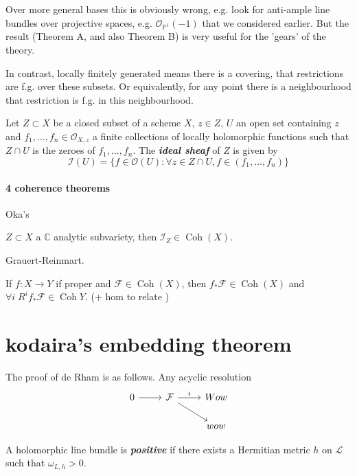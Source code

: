 \documentclass{article}
\newcommand{\C}{\mathbb{C}}
\renewcommand{\P}{\mathbb{P}}
\newcommand{\Fc}{\mathcal{F}}
\newcommand{\Ic}{\mathcal{I}}
\newcommand{\Lc}{\mathcal{L}}
\newcommand{\Oc}{\mathcal{O}}
\DeclareMathOperator{\Coh}{Coh}
\begin{document}
Over more general bases this is obviously wrong, e.g. look for anti-ample line bundles over projective spaces, e.g. $\Oc_{\P^1}(-1)$ that we considered earlier. But the result (Theorem A, and also Theorem B) is very useful for the 'gears' of the theory.

In contrast, locally finitely generated means there is a covering, that restrictions are f.g. over these subsets. Or equivalently, for any point there is a neighbourhood that restriction is f.g. in this neighbourhood.

\begin{defn}
	Let $Z\subset X$ be a closed subset of a scheme $X$, $z\in Z$, $U$ an open set containing $z$ and $f_1,\ldots,f_n\in\Oc_{X,z}$ a finite collections of locally holomorphic functions such that $Z\cap U$ is the zeroes of $f_1,\ldots,f_n$. The \textbf{\textit{ideal sheaf}} of $Z$ is given by
	\[\Ic(U)=\{f\in\Oc(U):\forall z\in Z\cap U, f\in(f_1,\ldots,f_n)\}\]
\end{defn}
\paragraph{4 coherence theorems}
\begin{thm}
	Oka's
\end{thm}
\begin{thm}
	$Z\subset X$ a $\C$ analytic subvariety, then $\Ic_Z\in \Coh(X)$.
\end{thm}
\begin{thm}
	Grauert-Reinmart.
\end{thm}
\begin{thm}
	If $f:X\to Y$ if proper and $\Fc\in\Coh(X)$, then $f_*\Fc\in\Coh(X)$ and $\forall i \;R^i f_*\Fc\in\Coh Y$. (+ hom to relate )
\end{thm}

\section{kodaira's embedding theorem}
The proof of de Rham is as follows.
Any acyclic resolution
\[\begin{tikzcd}
	0\arrow[r]&\Fc\arrow[r,"i"]\arrow[dr]&Wow\\
	&&wow
\end{tikzcd}\]

\begin{defn}
	A holomorphic line bundle is \textbf{\textit{positive}} if there exists a Hermitian metric $h$ on $\Lc$ such that $\omega_{L,h}>0$.
\end{defn}
\clearpage
\end{document}

